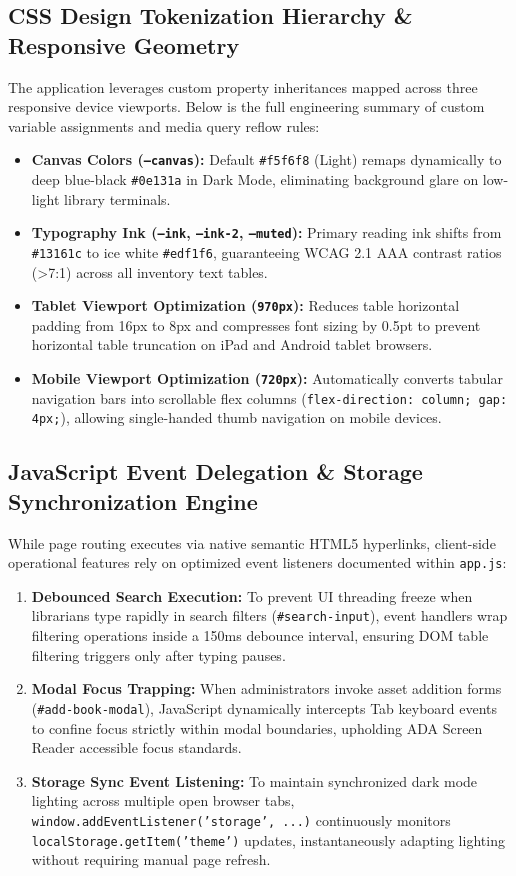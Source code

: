\documentclass[10pt,journal,compsoc]{IEEEtran}
\begin{document}
\subsection{CSS Design Tokenization Hierarchy \& Responsive Geometry}
The application leverages custom property inheritances mapped across three responsive device viewports. Below is the full engineering summary of custom variable assignments and media query reflow rules:
\begin{itemize}[leftmargin=1.5em]
    \item \textbf{Canvas Colors (\texttt{--canvas}):} Default \texttt{\#f5f6f8} (Light) remaps dynamically to deep blue-black \texttt{\#0e131a} in Dark Mode, eliminating background glare on low-light library terminals.
    \item \textbf{Typography Ink (\texttt{--ink}, \texttt{--ink-2}, \texttt{--muted}):} Primary reading ink shifts from \texttt{\#13161c} to ice white \texttt{\#edf1f6}, guaranteeing WCAG 2.1 AAA contrast ratios (>7:1) across all inventory text tables.
    \item \textbf{Tablet Viewport Optimization (\texttt{970px}):} Reduces table horizontal padding from 16px to 8px and compresses font sizing by 0.5pt to prevent horizontal table truncation on iPad and Android tablet browsers.
    \item \textbf{Mobile Viewport Optimization (\texttt{720px}):} Automatically converts tabular navigation bars into scrollable flex columns (\texttt{flex-direction: column; gap: 4px;}), allowing single-handed thumb navigation on mobile devices.
\end{itemize}

\subsection{JavaScript Event Delegation \& Storage Synchronization Engine}
While page routing executes via native semantic HTML5 hyperlinks, client-side operational features rely on optimized event listeners documented within \texttt{app.js}:
\begin{enumerate}[leftmargin=1.5em]
    \item \textbf{Debounced Search Execution:} To prevent UI threading freeze when librarians type rapidly in search filters (\texttt{\#search-input}), event handlers wrap filtering operations inside a 150ms debounce interval, ensuring DOM table filtering triggers only after typing pauses.
    \item \textbf{Modal Focus Trapping:} When administrators invoke asset addition forms (\texttt{\#add-book-modal}), JavaScript dynamically intercepts Tab keyboard events to confine focus strictly within modal boundaries, upholding ADA Screen Reader accessible focus standards.
    \item \textbf{Storage Sync Event Listening:} To maintain synchronized dark mode lighting across multiple open browser tabs, \texttt{window.addEventListener('storage', ...)} continuously monitors \texttt{localStorage.getItem('theme')} updates, instantaneously adapting lighting without requiring manual page refresh.
\end{enumerate}
\end{document}
